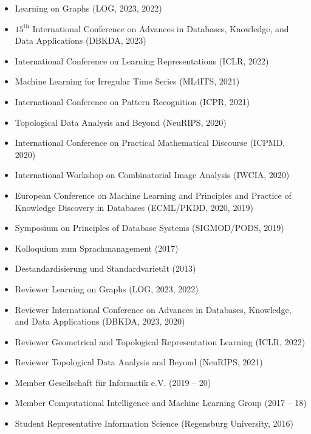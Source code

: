 \documentclass[a4paper,11pt]{article}
\newcommand{\years}[1]{\marginnote{\scriptsize #1}}
\begin{document}
\years{Conferences}
\vspace{-2pt}
\begin{itemize}[noitemsep, leftmargin=*]
    \item Learning on Graphs (LOG, 2023, 2022)
    \item $15^{\text{th}}$ International Conference on Advances in Databases, Knowledge,
          and Data Applications (DBKDA, 2023)
    \item International Conference on Learning Representations (ICLR, 2022)
    \item Machine Learning for Irregular Time Series (ML4ITS, 2021)
    \item International Conference on Pattern Recognition (ICPR, 2021)
    \item Topological Data Analysis and Beyond (NeuRIPS, 2020)
    \item International Conference on Practical Mathematical Discourse (ICPMD, 2020)
    \item International Workshop on Combinatorial Image Analysis (IWCIA, 2020)
    \item European Conference on Machine Learning and Principles and Practice of Knowledge Discovery in Databases (ECML/PKDD, 2020, 2019)
    \item Symposium on Principles of Database Systems (SIGMOD/PODS, 2019)
    \item Kolloquium zum Sprachmanagement (2017)
    \item Destandardisierung und Standardvarietät (2013)
\end{itemize}
\vspace{10pt}

\years{Service}
\vspace{-2pt}
\begin{itemize}[noitemsep, leftmargin=*]
    \item Reviewer Learning on Graphs (LOG, 2023, 2022)
    \item Reviewer International Conference on Advances in Databases, Knowledge,
          and Data Applications (DBKDA, 2023, 2020)
    \item Reviewer Geometrical and Topological Representation Learning (ICLR, 2022)
    \item Reviewer Topological Data Analysis and Beyond (NeuRIPS, 2021)
    \item Member Gesellschaft für Informatik e.V. (2019 -- 20)
    \item Member Computational Intelligence and Machine Learning Group (2017 -- 18)
    \item Student Representative Information Science (Regensburg University, 2016)
\end{itemize}
\vspace{10pt}
\end{document}
